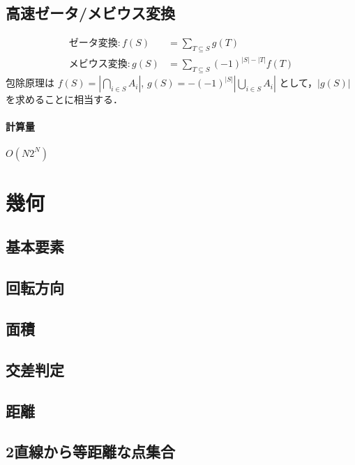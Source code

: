 \documentclass[landscape,twocolumn,9pt]{jsarticle}
\begin{document}
\subsection{高速ゼータ/メビウス変換}
\begin{align*}
\text{ゼータ変換}:   f(S)&=\sum_{T\subseteq S} g(T)\\
\text{メビウス変換}: g(S)&=\sum_{T\subseteq S} (-1)^{|S|-|T|}f(T)
\end{align*}
包除原理は
$f(S)=\left|\bigcap_{i\in S}A_i\right|$, $g(S)=-(-1)^{|S|}\left|\bigcup_{i\in S}A_i\right|$
として，$|g(S)|$を求めることに相当する．
\paragraph{計算量} $O(N 2^N)$


\section{幾何}%
\subsection{基本要素}


\subsection{回転方向}


\subsection{面積}


\subsection{交差判定}


\subsection{距離}


\subsection{2直線から等距離な点集合}

\end{document}
